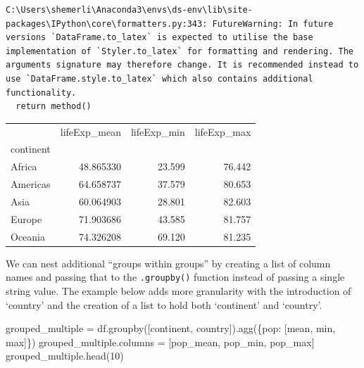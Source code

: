 \documentclass[
  letterpaper,
  DIV=11,
  numbers=noendperiod]{scrreprt}
\newenvironment{Shaded}{\begin{snugshade}}{\end{snugshade}}
\newcommand{\DecValTok}[1]{\textcolor[rgb]{0.68,0.00,0.00}{#1}}
\newcommand{\NormalTok}[1]{\textcolor[rgb]{0.00,0.23,0.31}{#1}}
\newcommand{\OperatorTok}[1]{\textcolor[rgb]{0.37,0.37,0.37}{#1}}
\newcommand{\StringTok}[1]{\textcolor[rgb]{0.13,0.47,0.30}{#1}}
\begin{document}
\begin{verbatim}
C:\Users\shemerli\Anaconda3\envs\ds-env\lib\site-packages\IPython\core\formatters.py:343: FutureWarning: In future versions `DataFrame.to_latex` is expected to utilise the base implementation of `Styler.to_latex` for formatting and rendering. The arguments signature may therefore change. It is recommended instead to use `DataFrame.style.to_latex` which also contains additional functionality.
  return method()
\end{verbatim}

\begin{tabular}{lrrr}
\toprule
{} &  lifeExp\_mean &  lifeExp\_min &  lifeExp\_max \\
continent &               &              &              \\
\midrule
Africa    &     48.865330 &       23.599 &       76.442 \\
Americas  &     64.658737 &       37.579 &       80.653 \\
Asia      &     60.064903 &       28.801 &       82.603 \\
Europe    &     71.903686 &       43.585 &       81.757 \\
Oceania   &     74.326208 &       69.120 &       81.235 \\
\bottomrule
\end{tabular}

We can nest additional ``groups within groups'' by creating a list of
column names and passing that to the \texttt{.groupby()} function
instead of passing a single string value. The example below adds more
granularity with the introduction of `country' and the creation of a
list to hold both `continent' and `country'.

\begin{Shaded}
\begin{Highlighting}[]
\NormalTok{grouped\_multiple }\OperatorTok{=}\NormalTok{ df.groupby([}\StringTok{\textquotesingle{}continent\textquotesingle{}}\NormalTok{, }\StringTok{\textquotesingle{}country\textquotesingle{}}\NormalTok{]).agg(\{}\StringTok{\textquotesingle{}pop\textquotesingle{}}\NormalTok{: [}\StringTok{\textquotesingle{}mean\textquotesingle{}}\NormalTok{, }\StringTok{\textquotesingle{}min\textquotesingle{}}\NormalTok{, }\StringTok{\textquotesingle{}max\textquotesingle{}}\NormalTok{]\})}
\NormalTok{grouped\_multiple.columns }\OperatorTok{=}\NormalTok{ [}\StringTok{\textquotesingle{}pop\_mean\textquotesingle{}}\NormalTok{, }\StringTok{\textquotesingle{}pop\_min\textquotesingle{}}\NormalTok{, }\StringTok{\textquotesingle{}pop\_max\textquotesingle{}}\NormalTok{]}
\NormalTok{grouped\_multiple.head(}\DecValTok{10}\NormalTok{)}
\end{Highlighting}
\end{Shaded}
\end{document}
